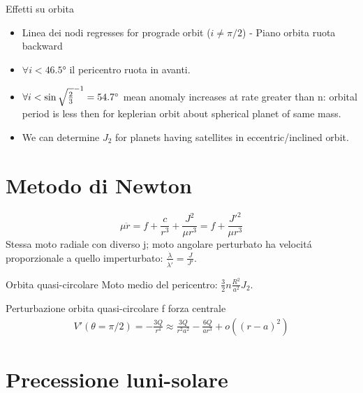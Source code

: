 \begin{frame}{Effetti su orbita}
\begin{itemize}
\item Linea dei nodi regresses for prograde orbit ($i\neq\pi/2$) - Piano orbita ruota backward
\item $\forall i<\ang{46.5}$ il pericentro ruota in avanti.
\item $\forall i<\sin{\sqrt{\frac{2}{3}}}^{-1}=\ang{54.7}$ mean anomaly increases at rate greater than n: orbital period is less then for keplerian orbit about spherical planet of same mass.
\item We can determine $J_2$ for planets having satellites in eccentric/inclined orbit.
\end{itemize}
\end{frame}

\section{Metodo di Newton}
\begin{equation*}
\mu\ddot{r}=f+\frac{c}{r^3}+\frac{J^2}{\mu r^3}=f+\frac{J'^2}{\mu r^3}
\end{equation*}
Stessa moto radiale con diverso j; moto angolare perturbato ha velocit\'a proporzionale a quello imperturbato: $\frac{\dot{\lambda}}{\dot{\lambda'}}=\frac{J}{J'}$.
\begin{block}{Orbita quasi-circolare}
Moto medio del pericentro: $\frac{3}{2}n\frac{R^2}{a^2}J_2$.
\end{block}
\begin{wordonframe}{Perturbazione orbita quasi-circolare}
f forza centrale
\begin{align*}
V'(\theta=\pi/2)=-\frac{3Q}{r^4}\approx\frac{3Q}{r^2a^2}-\frac{6Q}{ar^3}+o((r-a)^2)
\end{align*}
\end{wordonframe}

\section{Precessione luni-solare}

